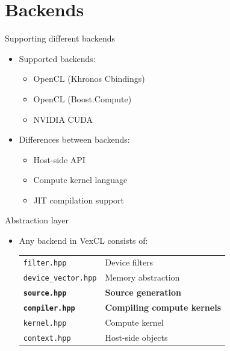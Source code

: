 \documentclass[@BEAMER_OPTIONS@]{beamer}
\newcommand{\CXX}{{\rm C}\plusplus}
\begin{document}
\section{Backends}

\begin{frame}{Supporting different backends}
    \begin{itemize}
        \item Supported backends:
            \begin{itemize}
                \item OpenCL (Khronos \CXX bindings)
                \item OpenCL (Boost.Compute)
                \item NVIDIA CUDA
            \end{itemize}
            \vspace{\baselineskip}

        \item Differences between backends:
            \begin{itemize}
                \item Host-side API
                \item Compute kernel language
                \item JIT compilation support
            \end{itemize}
    \end{itemize}
\end{frame}

\begin{frame}[fragile]{Abstraction layer}
    \begin{itemize}
        \item Any backend in VexCL consists of:
            \vspace{0.5\baselineskip}

            \begin{tabular}{ll}
                {\tt filter.hpp}         & Device filters                  \\
                {\tt device\_vector.hpp} & Memory abstraction              \\
                {\tt \bf source.hpp}     & {\bf Source generation}         \\
                {\tt \bf compiler.hpp}   & {\bf Compiling compute kernels} \\
                {\tt kernel.hpp}         & Compute kernel                  \\
                {\tt context.hpp}        & Host-side objects               \\
            \end{tabular}
    \end{itemize}
\end{frame}
\end{document}
